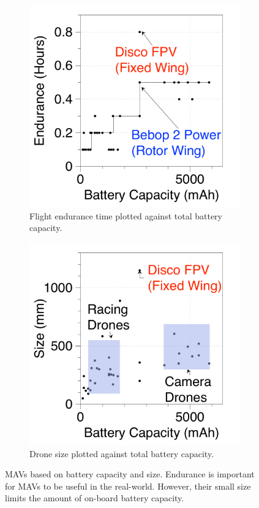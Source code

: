 \begin{figure}[t!]
\centering
    \begin{subfigure}{.49\columnwidth}
    \centering
    \includegraphics[trim=0 0 0 0, clip, width=0.9\columnwidth]{figs/Battery_Capacity_vs_Endurance_plot}
   \vspace{-5pt}
   \caption{Flight endurance time plotted against total battery capacity.}
    \label{fig:battery_capacity_vs_endurance}
    \end{subfigure}
    \hfill
    \begin{subfigure}{.49\columnwidth}
    \centering	
    \includegraphics[trim=0 0 0 0, clip, width=0.9\columnwidth]{figs/Size_vs_Battery_Capacity}
    \vspace{-5pt}
    \caption{Drone size plotted against total battery capacity.}
    \label{fig:battery_capacity_vs_size}
    \end{subfigure}
\caption{MAVs based on battery capacity and size. Endurance is important for MAVs to be useful in the real-world. However, their small size limits the amount of on-board battery capacity.}
\label{fig:tradeoff}
\end{figure}

